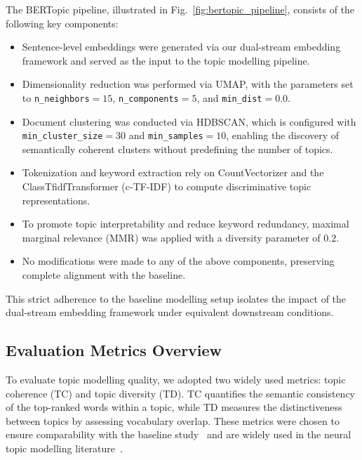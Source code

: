 \documentclass{ieeeaccess}
\begin{document}
The BERTopic pipeline, illustrated in Fig.~\ref{fig:bertopic_pipeline}, consists of the following key components:

\begin{itemize}[leftmargin=*,itemsep=2pt]
    \item Sentence-level embeddings were generated via our dual-stream embedding framework and served as the input to the topic modelling pipeline.
    
    \item Dimensionality reduction was performed via UMAP, with the parameters set to \texttt{n\_neighbors}$=15$, \texttt{n\_components}$=5$, and \texttt{min\_dist}$=0.0$.
    
    \item Document clustering was conducted via HDBSCAN, which is configured with \texttt{min\_cluster\_size}$=30$ and \texttt{min\_samples}$=10$, enabling the discovery of semantically coherent clusters without predefining the number of topics.
    
    \item Tokenization and keyword extraction rely on CountVectorizer and the ClassTfidfTransformer (c-TF-IDF) to compute discriminative topic representations.
    
    \item To promote topic interpretability and reduce keyword redundancy, maximal marginal relevance (MMR) was applied with a diversity parameter of 0.2.
    
    \item No modifications were made to any of the above components, preserving complete alignment with the baseline.
\end{itemize}

This strict adherence to the baseline modelling setup isolates the impact of the dual-stream embedding framework under equivalent downstream conditions.

\subsection{Evaluation Metrics Overview}
To evaluate topic modelling quality, we adopted two widely used metrics: topic coherence (TC) and topic diversity (TD). TC quantifies the semantic consistency of the top-ranked words within a topic, while TD measures the distinctiveness between topics by assessing vocabulary overlap. These metrics were chosen to ensure comparability with the baseline study~\cite{lezhnina_depression_2023} and are widely used in the neural topic modelling literature~\cite{dieng_topic_2020,mimno_optimizing_2011,roder_exploring_2015}. 
\end{document}
